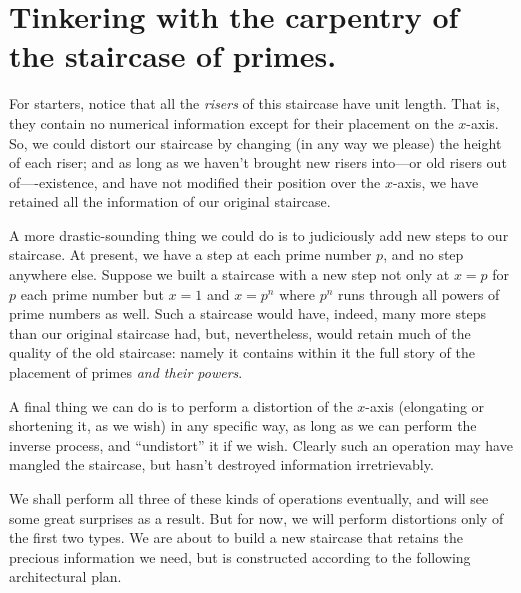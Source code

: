 \documentclass[11pt,draft]{article}
\theoremstyle{plain}
\theoremstyle{definition}
\numberwithin{equation}{section}
\numberwithin{figure}{section}
\numberwithin{table}{section}
\begin{document}
\section{Tinkering with the carpentry of the staircase of primes.}

 
For starters, notice that all the {\em risers} of this staircase have
unit length. That is, they contain no numerical information except for
their placement on the $x$-axis. So, we could distort our staircase by
changing (in any way we please) the height of each riser; and as long
as we haven't brought new risers into---or old risers out
of----existence, and have not modified their position over the
$x$-axis, we have retained all the information of our original
staircase.
   
   
A more drastic-sounding thing we could do is to judiciously add new
steps to our staircase. At present, we have a step at each prime
number $p$, and no step anywhere else. Suppose we built a staircase
with a new step not only at $x=p$ for $p$ each prime number but $x =1$
and $x=p^n$ where $p^n$ runs through all powers of prime numbers as
well. Such a staircase would have, indeed, many more steps than our
original staircase had, but, nevertheless, would retain much of the
quality of the old staircase: namely it contains within it the full
story of the placement of primes {\em and their powers}.
     
A final thing we can do is to perform a distortion of the $x$-axis
(elongating or shortening it, as we wish) in any specific way, as long
as we can perform the inverse process, and ``undistort'' it if we wish.
Clearly such an operation may have mangled the staircase, but hasn't destroyed
information irretrievably.
     
We shall perform all three of these kinds of operations eventually,
and will see some great surprises as a result.  But for now, we will
perform distortions only of the first two types.  We are about to
build a new staircase that retains the precious information we need,
but is constructed according to the following architectural plan.
 
\end{document}
